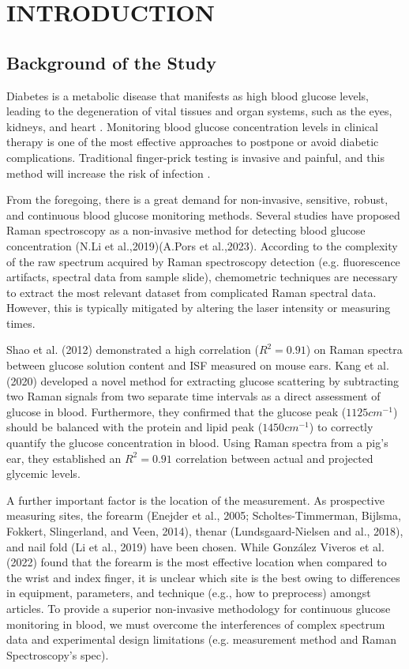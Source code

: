 \chapter{INTRODUCTION} 

\section{Background of the Study}

Diabetes is a metabolic disease that manifests as high blood glucose levels, leading to the degeneration of vital tissues and organ systems, such as the eyes, kidneys, and heart \cite{AB,reichert2021diabetes}. 
Monitoring blood glucose concentration levels in clinical therapy is one of the most effective approaches to postpone or avoid diabetic complications. 
Traditional finger-prick testing is invasive and painful, and this method will increase the risk of infection \cite{tang2020non}. 

From the foregoing, there is a great demand for non-invasive, sensitive, robust, and continuous blood glucose monitoring methods. 
Several studies have proposed Raman spectroscopy as a non-invasive method for detecting blood glucose concentration (N.Li et al.,2019)(A.Pors et al.,2023). 
According to the complexity of the raw spectrum acquired by Raman spectroscopy detection (e.g. fluorescence artifacts, spectral data from sample slide), chemometric techniques are necessary to extract the most relevant dataset from complicated Raman spectral data. 
However, this is typically mitigated by altering the laser intensity or measuring times.

Shao et al. (2012) demonstrated a high correlation ($R^2 = 0.91$) on Raman spectra between glucose solution content and ISF measured on mouse ears. 
Kang et al. (2020) developed a novel method for extracting glucose scattering by subtracting two Raman signals from two separate time intervals as a direct assessment of glucose in blood. 
Furthermore, they confirmed that the glucose peak ($1125cm^{-1}$) should be balanced with the protein and lipid peak ($1450cm^{-1}$) to correctly quantify the glucose concentration in blood. 
Using Raman spectra from a pig's ear, they established an $R^2 = 0.91$ correlation between actual and projected glycemic levels.

A further important factor is the location of the measurement. 
As prospective measuring sites, the forearm (Enejder et al., 2005; Scholtes-Timmerman, Bijlsma, Fokkert, Slingerland, and Veen, 2014), thenar (Lundsgaard-Nielsen and al., 2018), and nail fold (Li et al., 2019) have been chosen. 
While González Viveros et al. (2022) found that the forearm is the most effective location when compared to the wrist and index finger, it is unclear which site is the best owing to differences in equipment, parameters, and technique (e.g., how to preprocess) amongst articles. 
To provide a superior non-invasive methodology for continuous glucose monitoring in blood, we must overcome the interferences of complex spectrum data and experimental design limitations (e.g. measurement method and Raman Spectroscopy's spec).

